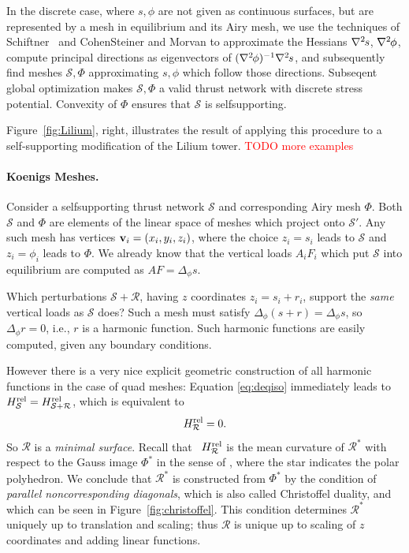 \documentclass[annual]{acmsiggraph}
\def\rel{{\mathord{\text{\rm rel}}}}
\def\ess{s}
\def\Hess#1{{\def\testess{#1}\nabla^2\ifx\testess\ess\!s\else #1\fi}}
\def\Hess#1{\text{$\nabla^2\hskip-.2ex #1$}}
\def\SS{{\mathcal S}}
\def\RR{{\mathcal R}}
\newcommand{\todo}[1]{\textcolor{red}{#1}}
\begin{document}
In the discrete case, where $s,\phi$ are not given as continuous surfaces, 
but are represented by a mesh in equilibrium and its Airy mesh, we use the 
techniques of Schiftner~ and Cohen\dash Steiner 
and Morvan  to approximate the Hessians 
$\Hess s$, $\Hess\phi$, compute principal directions as eigenvectors of 
$(\Hess\phi)^{-1}\Hess s$, and subsequently find meshes $\SS,\Phi$ 
approximating $s,\phi$ which follow those directions. Subseqent global 
optimization makes $\SS,\Phi$ a valid thrust network with discrete stress 
potential. Convexity of $\Phi$ ensures that $\SS$ is self\dash supporting.

Figure~\ref{fig:Lilium}, right, illustrates the result of applying this procedure
to a self-supporting modification of the Lilium tower. \todo{TODO more examples}

\paragraph{Koenigs Meshes.} 
Consider a self\dash supporting thrust network $\SS$ and corresponding 
Airy mesh $\Phi$. Both $\SS$ and $\Phi$ are elements of the linear space of 
meshes which project onto $\SS'$. Any such mesh has vertices 
${\mathbf v}_i=(x_i,y_i,z_i)$, where the choice $z_i=s_i$ leads to $\SS$ and 
$z_i=\phi_i$ leads to $\Phi$. We already know that the vertical loads 
$A_iF_i$ which put $\SS$ into equilibrium are computed as 
$AF=\Delta_\phi s$.

Which perturbations $\SS+\RR$, having $z$ coordinates $z_i = 
s_i+r_i$, support the {\em same} vertical loads as $\SS$ does? Such a mesh must satisfy 
$\Delta_\phi(s+r)=\Delta_\phi s$, so $\Delta_\phi r = 0$, i.e., 
$r$ is a harmonic function. Such harmonic functions are easily computed, given any boundary
conditions.

However there is a very nice explicit geometric construction of all 
harmonic functions in the case of quad meshes: Equation \eqref{eq:deqiso} 
immediately leads to $H^\rel_\SS=H^\rel_{\SS+\RR}$, which is equivalent to
	$$
	H^\rel_\RR = 0.
	$$
 So $\RR$ is a {\em minimal surface}. Recall that \ $H^\rel_\RR$ is the 
mean curvature of $\RR^*$ with respect to the Gauss image $\Phi^*$ in the 
sense of \cite{Pottmann2007b}, where the star indicates the polar 
polyhedron. We conclude that $\RR^*$ is constructed from $\Phi^*$ by the 
condition of {\em parallel non\dash corresponding diagonals}, which is 
also called Christoffel duality, and which can be seen in 
Figure~\ref{fig:christoffel}. This condition determines $\RR^*$ uniquely 
up to translation and scaling; thus $\RR$ is unique up to 
scaling of $z$ coordinates and adding linear functions.
\end{document}
